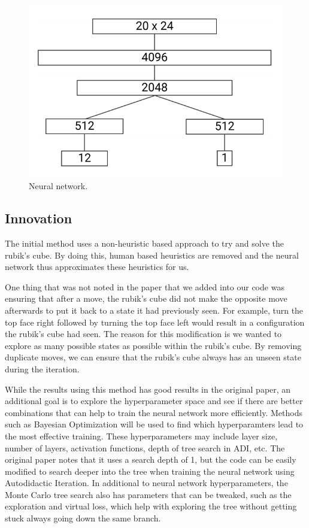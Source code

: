\documentclass[10pt,twocolumn,letterpaper]{article}
\begin{document}
\begin{figure}
  \includegraphics[width=\linewidth]{net.png}
  \caption{Neural network.}
  \label{fig:net}
\end{figure}

\subsection{Innovation}
The initial method uses a non-heuristic based approach to try and solve the rubik's cube. By doing this, human based heuristics are removed and the neural network thus approximates these heuristics for us. 

One thing that was not noted in the paper that we added into our code was ensuring that after a move, the rubik's cube did not make the opposite move afterwards to put it back to a state it had previously seen. For example, turn the top face right followed by turning the top face left would result in a configuration the rubik's cube had seen. The reason for this modification is we wanted to explore as many possible states as possible within the rubik's cube. By removing duplicate moves, we can ensure that the rubik's cube always has an unseen state during the iteration.

While the results using this method has good results in the original paper, an additional goal is to explore the hyperparameter space  and see if there are better combinations that can help to train the neural network more efficiently. Methods such as Bayesian Optimization will be used to find which hyperparamters lead to the most effective training. These hyperparameters may include layer size, number of layers, activation functions, depth of tree search in ADI, etc. The original paper notes that it uses a search depth of 1, but the code can be easily modified to search deeper into the tree when training the neural network using Autodidactic Iteration. In additional to neural network hyperparameters, the Monte Carlo tree search also has parameters that can be tweaked, such as the exploration and virtual loss, which help with exploring the tree without getting stuck always going down the same branch.
\end{document}
